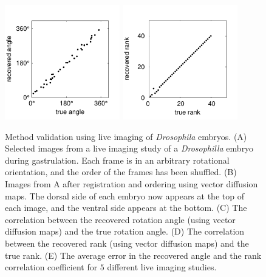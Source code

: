 \documentclass[twocolumn, 10pt]{article}
\begin{document}
\begin{figure}[t]
\includegraphics[width=5cm]{drosophila_live_imaging_angle_corr}
%
%
\includegraphics[width=5cm]{drosophila_live_imaging_rank_corr}
%
%
%
\caption{Method validation using live imaging of \textit{Drosophila} embryos. (A) Selected images from a live imaging study of a \textit{Drosophilla} embryo during gastrulation. Each frame is in an arbitrary rotational orientation, and the order of the frames has been shuffled. (B) Images from A after registration and ordering using vector diffusion maps. The dorsal side of each embryo now appears at the top of each image, and the ventral side appears at the bottom. (C) The correlation between the recovered rotation angle (using vector diffusion maps) and the true rotation angle. (D) The correlation between the recovered rank (using vector diffusion maps) and the true rank. (E) The average error in the recovered angle and the rank correlation coefficient for $5$ different live imaging studies. }
\label{fig:drosophila_live_imaging}
\end{figure}
\end{document}
